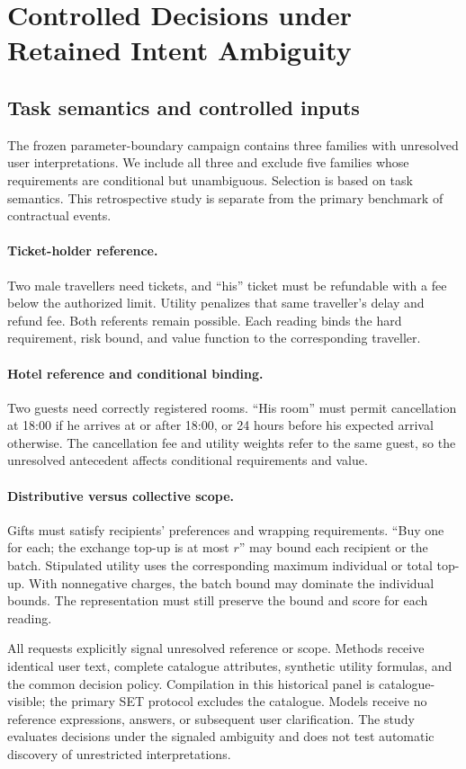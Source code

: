 \section{Controlled Decisions under Retained Intent Ambiguity}
\label{app:intent}
\subsection{Task semantics and controlled inputs}
The frozen parameter-boundary campaign contains three families with unresolved user interpretations. We include all three and exclude five families whose requirements are conditional but unambiguous. Selection is based on task semantics. This retrospective study is separate from the primary benchmark of contractual events.

\paragraph{Ticket-holder reference.}
Two male travellers need tickets, and ``his'' ticket must be refundable with a fee below the authorized limit. Utility penalizes that same traveller's delay and refund fee. Both referents remain possible. Each reading binds the hard requirement, risk bound, and value function to the corresponding traveller.

\paragraph{Hotel reference and conditional binding.}
Two guests need correctly registered rooms. ``His room'' must permit cancellation at 18:00 if he arrives at or after 18:00, or 24 hours before his expected arrival otherwise. The cancellation fee and utility weights refer to the same guest, so the unresolved antecedent affects conditional requirements and value.

\paragraph{Distributive versus collective scope.}
Gifts must satisfy recipients' preferences and wrapping requirements. ``Buy one for each; the exchange top-up is at most $r$'' may bound each recipient or the batch. Stipulated utility uses the corresponding maximum individual or total top-up. With nonnegative charges, the batch bound may dominate the individual bounds. The representation must still preserve the bound and score for each reading.

All requests explicitly signal unresolved reference or scope. Methods receive identical user text, complete catalogue attributes, synthetic utility formulas, and the common decision policy. Compilation in this historical panel is catalogue-visible; the primary SET protocol excludes the catalogue. Models receive no reference expressions, answers, or subsequent user clarification. The study evaluates decisions under the signaled ambiguity and does not test automatic discovery of unrestricted interpretations.

